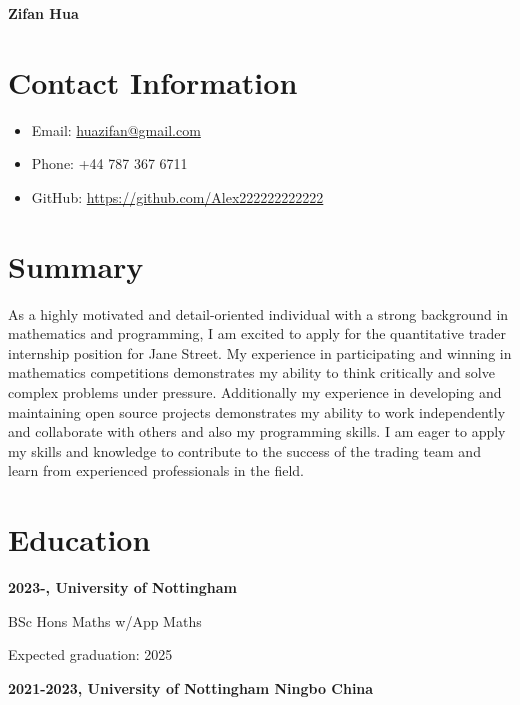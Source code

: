 \documentclass{article}
\begin{document}
\begin{center}
    \textbf{\Large Zifan Hua}
\end{center}

\section*{Contact Information}
\begin{itemize}[leftmargin=*]
    \item Email: \href{mailto:huazifan@gmail.com}{huazifan@gmail.com}
    \item Phone: +44 787 367 6711
    \item GitHub: \href{https://github.com/Alex222222222222}{https://github.com/Alex222222222222}
\end{itemize}

\section*{Summary}
As a highly motivated and detail-oriented individual with a strong background in mathematics and programming, I am excited to apply for the quantitative trader internship position for Jane Street. 
My experience in participating and winning in mathematics competitions demonstrates my ability to think critically and solve complex problems under pressure.
Additionally my experience in developing and maintaining open source projects demonstrates my ability to work independently and collaborate with others and also my programming skills.
I am eager to apply my skills and knowledge to contribute to the success of the trading team and learn from experienced professionals in the field.

\section*{Education}
    \noindent\textbf{2023-, University of Nottingham}

    \noindent BSc Hons Maths w/App Maths

    \noindent Expected graduation: 2025

    \textbf{2021-2023, University of Nottingham Ningbo China}
\end{document}
